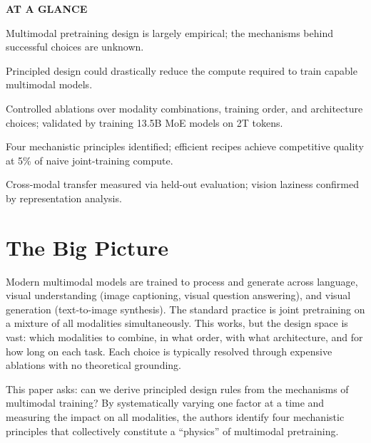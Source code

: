 \documentclass[10pt,twocolumn]{article}
\begin{document}
\begin{mdframed}[backgroundcolor=boxgray,linecolor=rulered,linewidth=1pt,
    innerleftmargin=6pt,innerrightmargin=6pt,
    innertopmargin=6pt,innerbottommargin=6pt]
\textbf{\small AT A GLANCE}\par\vspace{4pt}
\begin{description}[leftmargin=0pt,labelsep=4pt,itemsep=2pt,parsep=0pt,
    font=\small\bfseries]
  \item[Problem:] Multimodal pretraining design is largely empirical;
    the mechanisms behind successful choices are unknown.
  \item[Why it matters:] Principled design could drastically reduce the compute
    required to train capable multimodal models.
  \item[Method:] Controlled ablations over modality combinations, training order,
    and architecture choices; validated by training 13.5B MoE models on 2T tokens.
  \item[Result:] Four mechanistic principles identified; efficient recipes
    achieve competitive quality at 5\% of naive joint-training compute.
  \item[Evidence:] Cross-modal transfer measured via held-out evaluation;
    vision laziness confirmed by representation analysis.
\end{description}
\end{mdframed}

\section{The Big Picture}

Modern multimodal models are trained to process and generate across language, visual
understanding (image captioning, visual question answering), and visual generation
(text-to-image synthesis). The standard practice is joint pretraining on a mixture
of all modalities simultaneously. This works, but the design space is vast:
which modalities to combine, in what order, with what architecture, and for how
long on each task. Each choice is typically resolved through expensive ablations
with no theoretical grounding.

This paper asks: can we derive principled design rules from the mechanisms of
multimodal training? By systematically varying one factor at a time and measuring
the impact on all modalities, the authors identify four mechanistic principles
that collectively constitute a ``physics'' of multimodal pretraining.
\end{document}
